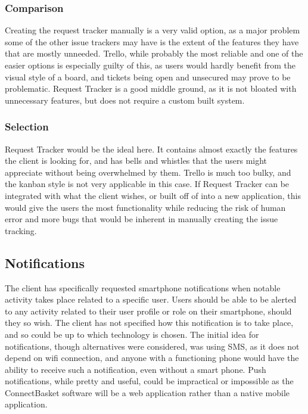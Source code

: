 \documentclass[onecolumn, draftclsnofoot,10pt, compsoc]{IEEEtran}
\begin{document}
\subsubsection{Comparison}
Creating the request tracker manually is a very valid option, as a major problem some of the other issue trackers may have is the extent of the features they have that are mostly 
unneeded. Trello, while probably the most reliable and one of the easier options is especially guilty of this, as users would hardly benefit from the visual style of a board, and 
tickets being open and unsecured may prove to be problematic. Request Tracker is a good middle ground, as it is not bloated with unnecessary features, but does not require a custom
built system.
\subsubsection{Selection}
Request Tracker would be the ideal here. It contains almost exactly the features the client is looking for, and has bells and whistles that the users might appreciate without being 
overwhelmed by them. Trello is much too bulky, and the kanban style is not very applicable in this case. If Request Tracker can be integrated with what the client wishes, or built off 
of into a new application, this would give the users the most functionality while reducing the risk of human error and more bugs that would be inherent in manually creating the issue 
tracking.


\subsection{Notifications}
The client has specifically requested smartphone notifications when notable activity takes place related to a specific user. Users should be able to be alerted to any activity 
related to their user profile or role on their smartphone, should they so wish. The client has not specified how this notification is to take place, and so could be up to which technology 
is chosen. The initial idea for notifications, though alternatives were considered, was using SMS, as it does not depend on wifi connection, and anyone with a functioning phone would 
have the ability to receive such a notification, even without a smart phone. Push notifications, while pretty and useful, could be impractical or impossible as the ConnectBasket software 
will be a web application rather than a native mobile application.
\end{document}
